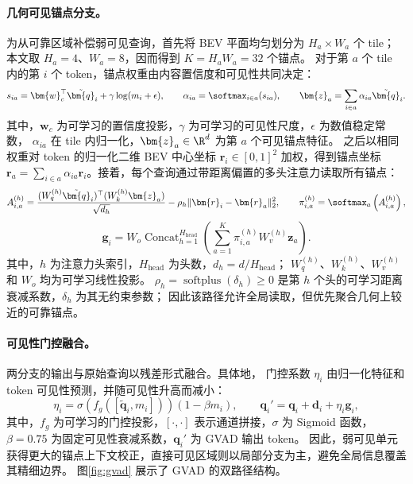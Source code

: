 \paragraph{几何可见锚点分支。}
为从可靠区域补偿弱可见查询，首先将 BEV 平面均匀划分为 $H_a\times W_a$ 个 tile；
本文取 $H_a=4$、$W_a=8$，因而得到 $K=H_aW_a=32$ 个锚点。
对于第 $a$ 个 tile 内的第 $i$ 个 token，锚点权重由内容置信度和可见性共同决定：
\begin{equation}
s_{ia}=\bm{w}_c^\top\tilde{\bm{q}}_i+\gamma\log(m_i+\epsilon),\qquad
\alpha_{ia}=\softmax_{i\in a}(s_{ia}),\qquad
\bm{z}_a=\sum_{i\in a}\alpha_{ia}\tilde{\bm{q}}_i .
\end{equation}
其中，$\bm{w}_c$ 为可学习的置信度投影，$\gamma$ 为可学习的可见性尺度，$\epsilon$ 为数值稳定常数，
$\alpha_{ia}$ 在 tile 内归一化，$\bm{z}_a\in\R^d$ 为第 $a$ 个可见锚点特征。
之后以相同权重对 token 的归一化二维 BEV 中心坐标 $\bm{r}_i\in[0,1]^2$ 加权，得到锚点坐标
$\bm{r}_a=\sum_{i\in a}\alpha_{ia}\bm{r}_i$。接着，每个查询通过带距离偏置的多头注意力读取所有锚点：
\begin{equation}
A_{i,a}^{(h)}=\frac{(W_q^{(h)}\tilde{\bm{q}}_i)^\top(W_k^{(h)}\bm{z}_a)}{\sqrt{d_h}}
-\rho_h\|\bm{r}_i-\bm{r}_a\|_2^2,\qquad
\pi_{i,a}^{(h)}=\softmax_a\left(A_{i,a}^{(h)}\right),
\end{equation}
\begin{equation}
\bm{g}_i=W_o\operatorname{Concat}_{h=1}^{H_{\mathrm{head}}}
\left(\sum_{a=1}^{K}\pi_{i,a}^{(h)}W_v^{(h)}\bm{z}_a\right).
\end{equation}
其中，$h$ 为注意力头索引，$H_{\mathrm{head}}$ 为头数，$d_h=d/H_{\mathrm{head}}$；
$W_q^{(h)}$、$W_k^{(h)}$、$W_v^{(h)}$ 和 $W_o$ 均为可学习线性投影。
$\rho_h=\operatorname{softplus}(\delta_h)\geq0$ 是第 $h$ 个头的可学习距离衰减系数，$\delta_h$ 为其无约束参数；
因此该路径允许全局读取，但优先聚合几何上较近的可靠锚点。

\paragraph{可见性门控融合。}
两分支的输出与原始查询以残差形式融合。具体地，
门控系数 $\eta_i$ 由归一化特征和 token 可见性预测，并随可见性升高而减小：
\begin{equation}
\eta_i=\sigma\left(f_g([\tilde{\bm{q}}_i,m_i])\right)(1-\beta m_i),\qquad
\bm{q}_i'=\bm{q}_i+\bm{d}_i+\eta_i\bm{g}_i,
\end{equation}
其中，$f_g$ 为可学习的门控投影，$[\cdot,\cdot]$ 表示通道拼接，$\sigma$ 为 Sigmoid 函数，
$\beta=0.75$ 为固定可见性衰减系数，$\bm{q}_i'$ 为 GVAD 输出 token。
因此，弱可见单元获得更大的锚点上下文校正，直接可见区域则以局部分支为主，避免全局信息覆盖其精细边界。
图\ref{fig:gvad} 展示了 GVAD 的双路径结构。

